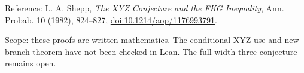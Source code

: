 \documentclass[11pt,letterpaper]{article}
\begin{document}
Reference: L. A. Shepp, \emph{The XYZ Conjecture and the FKG
Inequality}, Ann. Probab. 10 (1982), 824--827,
\href{https://doi.org/10.1214/aop/1176993791}{doi:10.1214/aop/1176993791}.

Scope: these proofs are written mathematics. The conditional XYZ use and
new branch theorem have not been checked in Lean. The full width-three
conjecture remains open.
\end{document}
